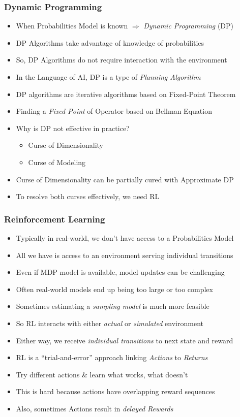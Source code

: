 \documentclass[handout]{beamer}
\begin{document}
\begin{frame}
\frametitle{Dynamic Programming}
\pause
\begin{itemize}[<+->]
\item When Probabilities Model is known $\Rightarrow$ {\em Dynamic Programming} (DP)
\item DP Algorithms take advantage of knowledge of probabilities
\item So, DP Algorithms do not require interaction with the environment
\item In the Language of AI, DP is a type of {\em Planning Algorithm}
\item DP algorithms are iterative algorithms based on Fixed-Point Theorem
\item Finding a {\em Fixed Point} of Operator based on Bellman Equation
\item Why is DP not effective in practice?
\pause
\begin{itemize}[<+->]
\item Curse of Dimensionality
\item Curse of Modeling
\end{itemize}
\item Curse of Dimensionality can be partially cured with Approximate DP
\item To resolve both curses effectively, we need RL
\end{itemize}
\end{frame}

\begin{frame}
\frametitle{Reinforcement Learning}
\pause
\begin{itemize}[<+->]
\item Typically in real-world, we don't have access to a Probabilities Model
\item All we have is access to an environment serving individual transitions
\item Even if MDP model is available, model updates can be challenging
\item Often real-world models end up being too large or too complex
\item Sometimes estimating a {\em sampling model} is much more feasible
\item So RL interacts with either {\em actual} or {\em simulated} environment
\item Either way, we receive {\em individual transitions} to next state and reward
\item RL is a ``trial-and-error'' approach linking {\em Actions} to {\em Returns}
\item Try different actions \& learn what works, what doesn't
\item This is hard because actions have overlapping reward sequences
\item Also, sometimes Actions result in {\em delayed Rewards}
\end{itemize}
\end{frame}
\end{document}
